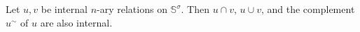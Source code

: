 Let $u, v$ be internal $n$-ary relations on $\mathbb{S}^\sigma$. Then $u \cap v$, $u \cup v$, and the complement $u^\sim$ of $u$ are also internal.
